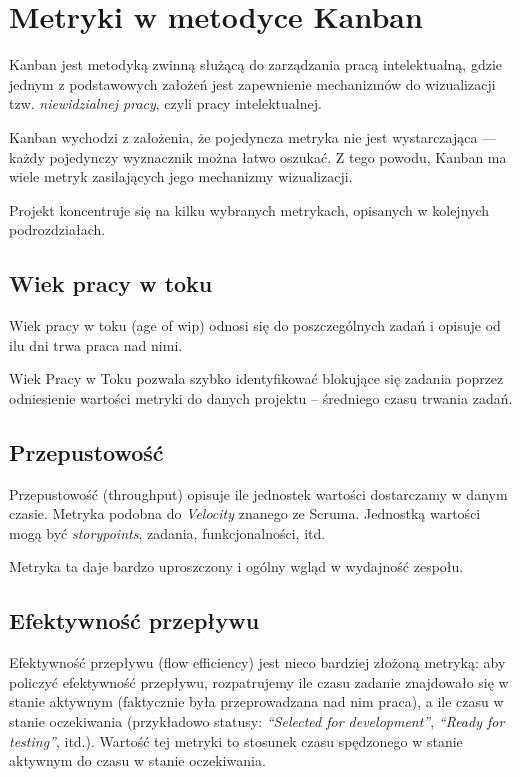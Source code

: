 \section{Metryki w metodyce Kanban}
Kanban jest metodyką zwinną służącą do zarządzania pracą intelektualną, gdzie jednym z podstawowych założeń jest zapewnienie mechanizmów
do wizualizacji tzw. \textit{niewidzialnej pracy}, czyli pracy intelektualnej.

Kanban wychodzi z założenia, że pojedyncza metryka nie jest wystarczająca --- każdy pojedynczy wyznacznik można łatwo oszukać. Z tego powodu, Kanban ma wiele metryk zasilających jego mechanizmy wizualizacji.

Projekt koncentruje się na kilku wybranych metrykach, opisanych w kolejnych podrozdziałach.

\subsection{Wiek pracy w toku}
Wiek pracy w toku (age of wip) odnosi się do poszczególnych zadań i opisuje od ilu dni trwa praca nad nimi.

Wiek Pracy w Toku pozwala szybko identyfikować blokujące się zadania poprzez odniesienie wartości metryki do danych projektu -- średniego czasu trwania zadań.

\subsection{Przepustowość}
Przepustowość (throughput) opisuje ile jednostek wartości dostarczamy w danym czasie. Metryka podobna do \textit{Velocity} znanego ze Scruma. Jednostką wartości mogą być \textit{storypoints}, zadania, funkcjonalności, itd.

Metryka ta daje bardzo uproszczony i ogólny wgląd w wydajność zespołu.

\subsection{Efektywność przepływu}
Efektywność przepływu (flow efficiency) jest nieco bardziej złożoną metryką: aby policzyć efektywność przepływu, rozpatrujemy ile czasu zadanie znajdowało się w stanie aktywnym (faktycznie była przeprowadzana nad nim praca), a ile czasu
w stanie oczekiwania (przykładowo statusy: \textit{``Selected for development''}, \textit{``Ready for testing''}, itd.). Wartość tej metryki to stosunek czasu spędzonego w stanie aktywnym do czasu w stanie oczekiwania.

